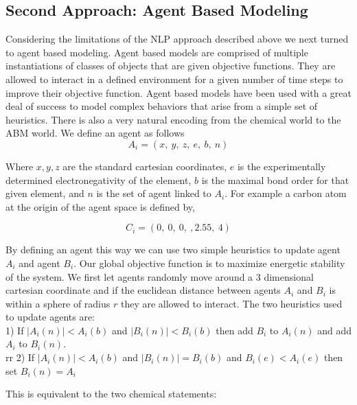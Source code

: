 \documentclass[aps,floatfix,prd,showpacs]{revtex4}
\begin{document}
\subsection{Second Approach: Agent Based Modeling }
Considering the limitations of the NLP approach described above we next turned to agent based modeling. Agent based models are comprised of multiple instantiations of classes of objects that are given objective functions. They are allowed to interact in a defined environment for a given number of time steps to improve their objective function. Agent based models have been used with a great deal of success to model complex behaviors that arise from a simple set of heuristics. There is also a very natural encoding from the chemical world to the ABM world. We define an agent as follows
$$A_i = (x, \ y, \ z, \ e, \ b, \ n)$$

Where $x,y,z$ are the standard cartesian coordinates, $e$ is the experimentally determined electronegativity of the element, $b$ is the maximal bond order for that given element, and $n$ is the set of agent linked to $A_i$. For example a carbon atom at the origin of the agent space is defined by,

$$C_i = (0, \ 0, \ 0, \ , 2.55, \ 4)$$

By defining an agent this way we can use two simple heuristics to update agent $A_i$ and agent $B_i$. Our global objective function is to maximize energetic stability of the system. We first let agents randomly move around a 3 dimensional cartesian coordinate and if the euclidean distance between agents $A_i$ and $B_i$ is within a sphere of radius $r$ they are allowed to interact. The two heuristics used to update agents are:\\

1) If $|A_i(n)| < A_i(b)$ and  $|B_i(n)| < B_i(b)$  then add $B_i$ to $A_i(n)$ and add $A_i$ to $B_i(n)$. 
\\rr
  2) If $|A_i(n)| < A_i(b)$ and $|B_i(n)| = B_i(b)$ and $B_i(e) < A_i(e)$  then set $B_i(n) =  {A_i}$
  
 This is equivalent to the two chemical statements:
 
\end{document}
